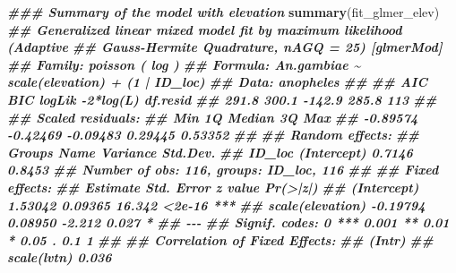 \documentclass[
  letterpaper,
]{krantz}
\newenvironment{Shaded}{\begin{snugshade}}{\end{snugshade}}
\newcommand{\DocumentationTok}[1]{\textcolor[rgb]{0.56,0.35,0.01}{\textbf{\textit{#1}}}}
\newcommand{\FunctionTok}[1]{\textcolor[rgb]{0.13,0.29,0.53}{\textbf{#1}}}
\newcommand{\NormalTok}[1]{#1}
\begin{document}
\begin{Shaded}
\begin{Highlighting}[]
\DocumentationTok{\#\#\# Summary of the model with elevation}
\FunctionTok{summary}\NormalTok{(fit\_glmer\_elev)}
\DocumentationTok{\#\# Generalized linear mixed model fit by maximum likelihood (Adaptive}
\DocumentationTok{\#\#   Gauss{-}Hermite Quadrature, nAGQ = 25) [glmerMod]}
\DocumentationTok{\#\#  Family: poisson  ( log )}
\DocumentationTok{\#\# Formula: An.gambiae \textasciitilde{} scale(elevation) + (1 | ID\_loc)}
\DocumentationTok{\#\#    Data: anopheles}
\DocumentationTok{\#\# }
\DocumentationTok{\#\#       AIC       BIC    logLik {-}2*log(L)  df.resid }
\DocumentationTok{\#\#     291.8     300.1    {-}142.9     285.8       113 }
\DocumentationTok{\#\# }
\DocumentationTok{\#\# Scaled residuals: }
\DocumentationTok{\#\#      Min       1Q   Median       3Q      Max }
\DocumentationTok{\#\# {-}0.89574 {-}0.42469 {-}0.09483  0.29445  0.53352 }
\DocumentationTok{\#\# }
\DocumentationTok{\#\# Random effects:}
\DocumentationTok{\#\#  Groups Name        Variance Std.Dev.}
\DocumentationTok{\#\#  ID\_loc (Intercept) 0.7146   0.8453  }
\DocumentationTok{\#\# Number of obs: 116, groups:  ID\_loc, 116}
\DocumentationTok{\#\# }
\DocumentationTok{\#\# Fixed effects:}
\DocumentationTok{\#\#                  Estimate Std. Error z value Pr(\textgreater{}|z|)    }
\DocumentationTok{\#\# (Intercept)       1.53042    0.09365  16.342   \textless{}2e{-}16 ***}
\DocumentationTok{\#\# scale(elevation) {-}0.19794    0.08950  {-}2.212    0.027 *  }
\DocumentationTok{\#\# {-}{-}{-}}
\DocumentationTok{\#\# Signif. codes:  0 \textquotesingle{}***\textquotesingle{} 0.001 \textquotesingle{}**\textquotesingle{} 0.01 \textquotesingle{}*\textquotesingle{} 0.05 \textquotesingle{}.\textquotesingle{} 0.1 \textquotesingle{} \textquotesingle{} 1}
\DocumentationTok{\#\# }
\DocumentationTok{\#\# Correlation of Fixed Effects:}
\DocumentationTok{\#\#             (Intr)}
\DocumentationTok{\#\# scale(lvtn) 0.036}


\end{Highlighting}
\end{Shaded}
\end{document}

